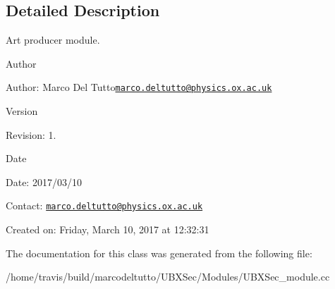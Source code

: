 \subsection{Detailed Description}
Art producer module. 

\begin{DoxyAuthor}{Author}

\end{DoxyAuthor}
\begin{DoxyParagraph}{Author\-:}
Marco Del Tutto\href{mailto:marco.deltutto@physics.ox.ac.uk}{\tt marco.\-deltutto@physics.\-ox.\-ac.\-uk} 
\end{DoxyParagraph}


\begin{DoxyVersion}{Version}

\end{DoxyVersion}
\begin{DoxyParagraph}{Revision\-:}
1. 
\end{DoxyParagraph}


\begin{DoxyDate}{Date}

\end{DoxyDate}
\begin{DoxyParagraph}{Date\-:}
2017/03/10 
\end{DoxyParagraph}


Contact\-: \href{mailto:marco.deltutto@physics.ox.ac.uk}{\tt marco.\-deltutto@physics.\-ox.\-ac.\-uk}

Created on\-: Friday, March 10, 2017 at 12\-:32\-:31 

The documentation for this class was generated from the following file\-:\begin{DoxyCompactItemize}
\item 
/home/travis/build/marcodeltutto/\-U\-B\-X\-Sec/\-Modules/U\-B\-X\-Sec\-\_\-module.\-cc\end{DoxyCompactItemize}
